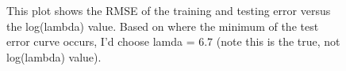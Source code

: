 \begin{figure}[h!tbp]
        \caption{This plot shows the RMSE of the training and testing error
        versus the log(lambda) value. Based on where the minimum of the test
        error curve occurs, I'd choose lamda = $6.7$ (note this is the true,
        not log(lambda) value).}
\end{figure}

